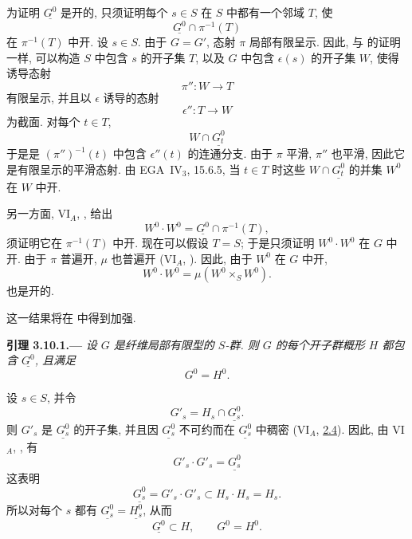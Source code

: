 为证明 \(\underline{G^0}\) 是开的, 只须证明每个 \(s\in S\)
在 \(S\) 中都有一个邻域 \(T\), 使
\[
  \underline{G^0}\cap\pi^{-1}(T)
\]
在 \(\pi^{-1}(T)\) 中开. 设 \(s\in S\). 由于 \(G=G'\),
态射 \(\pi\) 局部有限呈示. 因此, 与
 的证明一样, 可以构造 \(S\) 中包含 \(s\)
的开子集 \(T\), 以及 \(G\) 中包含 \(\epsilon(s)\) 的开子集 \(W\),
使得诱导态射
\[
  \pi'':W\longrightarrow T
\]
有限呈示, 并且以 \(\epsilon\) 诱导的态射
\[
  \epsilon'':T\longrightarrow W
\]
为截面. 对每个 \(t\in T\),
\[
  W\cap\underline{G_t^0}
\]
于是是 \((\pi'')^{-1}(t)\) 中包含 \(\epsilon''(t)\) 的连通分支.
由于 \(\pi\) 平滑, \(\pi''\) 也平滑, 因此它是有限呈示的平滑态射.
由 EGA~IV\(_3\), 15.6.5, 当 \(t\in T\) 时这些
\(W\cap\underline{G_t^0}\) 的并集 \(W^0\) 在 \(W\) 中开.

另一方面, VI\(_A\), , 给出
\[
  W^0\cdot W^0=\underline{G^0}\cap\pi^{-1}(T),
\]
须证明它在 \(\pi^{-1}(T)\) 中开. 现在可以假设 \(T=S\);
于是只须证明 \(W^0\cdot W^0\) 在 \(G\) 中开.
由于 \(\pi\) 普遍开, \(\mu\) 也普遍开
(VI\(_A\), ).
因此, 由于 \(W^0\) 在 \(G\) 中开,
\[
  W^0\cdot W^0=\mu(W^0\times_S W^0).
\]
也是开的.

这一结果将在  中得到加强.

\medskip
{}\label{lem:sga3-VIB-3.10.1}%
\noindent\textbf{引理 3.10.1.---}
\emph{设 \(G\) 是纤维局部有限型的 \(S\)-群.
则 \(G\) 的每个开子群概形 \(H\) 都包含 \(\underline{G^0}\), 且满足}
\[
  G^0=H^0.
\]

设 \(s\in S\), 并令
\[
  G'_s=H_s\cap\underline{G_s^0}.
\]
则 \(G'_s\) 是 \(\underline{G_s^0}\) 的开子集,
并且因 \(\underline{G_s^0}\) 不可约而在 \(\underline{G_s^0}\) 中稠密
(VI\(_A\), \hyperref[cor:sga3-VIB-2.4]{2.4}).
因此, 由 VI\(_A\), , 有
\[
  G'_s\cdot G'_s=\underline{G_s^0}
\]
这表明
\[
  \underline{G_s^0}=G'_s\cdot G'_s\subset H_s\cdot H_s=H_s.
\]
所以对每个 \(s\) 都有 \(\underline{G_s^0}=\underline{H_s^0}\), 从而
\[
  \underline{G^0}\subset H,\qquad G^0=H^0.
\]
